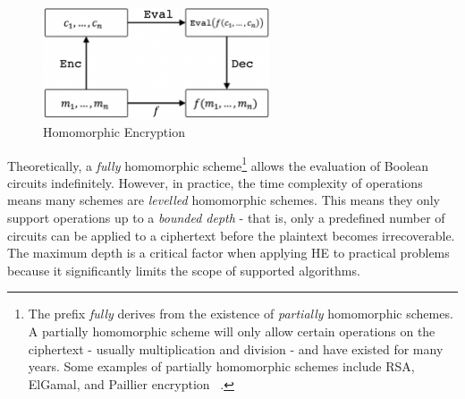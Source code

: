 \begin{figure}[ht]
    \centering
    \includegraphics[width=0.6\textwidth]{figures/homomorphicEncryption.png}
    \caption[Homomorphic Encryption]{Homomorphic Encryption}
    \label{fig:homomorphicEncryption}
\end{figure}

Theoretically, a \textit{fully} homomorphic scheme\footnote{The prefix \textit{fully} derives from the existence of \textit{partially} homomorphic schemes. A partially homomorphic scheme will only allow certain operations on the ciphertext - usually multiplication and division - and have existed for many years. Some examples of partially homomorphic schemes include RSA, ElGamal, and Paillier encryption ~\cite{PartialSchemes}.} allows the evaluation of Boolean circuits indefinitely. However, in practice, the time complexity of operations means many schemes are \textit{levelled} homomorphic schemes. This means they only support operations up to a \textit{bounded depth} - that is, only a predefined number of circuits can be applied to a ciphertext before the plaintext becomes irrecoverable. The maximum depth is a critical factor when applying HE to practical problems because it significantly limits the scope of supported algorithms.

\setlength{\leftskip}{0cm}
